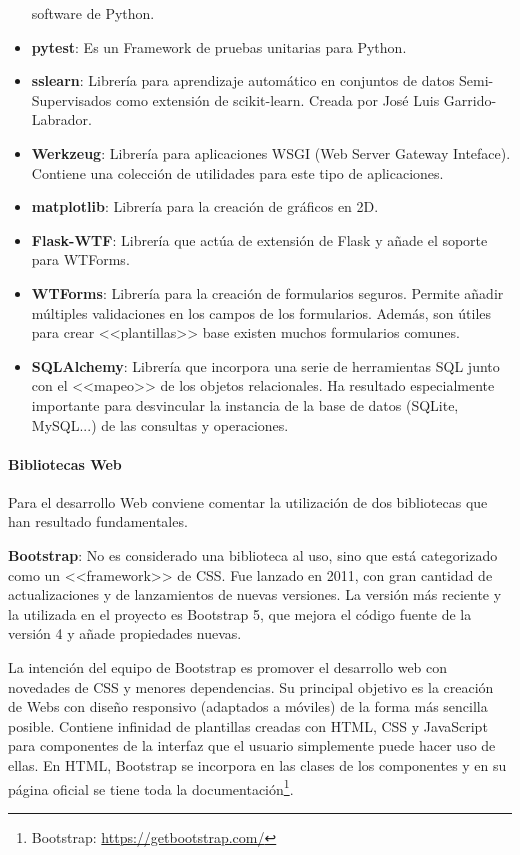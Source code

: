 \begin{itemize}
	software de Python.
	\item \textbf{pytest}: Es un Framework de pruebas unitarias para Python.
	\item \textbf{sslearn}: Librería para aprendizaje automático en conjuntos de
	datos Semi-Supervisados como extensión de scikit-learn. Creada por José Luis
	Garrido-Labrador.
	\item \textbf{Werkzeug}: Librería para aplicaciones WSGI (Web Server Gateway
	Inteface). Contiene una colección de utilidades para este tipo de
	aplicaciones.
	\item \textbf{matplotlib}: Librería para la creación de gráficos en 2D.
	\item \textbf{Flask-WTF}: Librería que actúa de extensión de Flask y añade
	el soporte para WTForms.
	\item \textbf{WTForms}: Librería para la creación de formularios seguros.
	Permite añadir múltiples validaciones en los campos de los formularios.
	Además, son útiles para crear <<plantillas>> base existen muchos formularios
	comunes.
	\item \textbf{SQLAlchemy}: Librería que incorpora una serie de herramientas
	SQL junto con el <<mapeo>> de los objetos relacionales. Ha resultado
	especialmente importante para desvincular la instancia de la base de datos
	(SQLite, MySQL...) de las consultas y operaciones.
\end{itemize}

\paragraph{Bibliotecas Web} Para el desarrollo Web conviene comentar la
utilización de dos bibliotecas que han resultado fundamentales.

\textbf{Bootstrap}: No es considerado una biblioteca al uso, sino que está
categorizado como un <<framework>> de CSS. Fue lanzado en 2011, con gran
cantidad de actualizaciones y de lanzamientos de nuevas versiones. La versión
más reciente y la utilizada en el proyecto es Bootstrap 5, que mejora el código
fuente de la versión 4 y añade propiedades nuevas. 

La intención del equipo de Bootstrap es promover el desarrollo web con novedades
de CSS y menores dependencias. Su principal objetivo es la creación de Webs con
diseño responsivo (adaptados a móviles) de la forma más sencilla posible.
Contiene infinidad de plantillas creadas con HTML, CSS y JavaScript para
componentes de la interfaz que el usuario simplemente puede hacer uso de ellas.
En HTML, Bootstrap se incorpora en las clases de los componentes y en su página
oficial se tiene toda la documentación\footnote{Bootstrap:
\url{https://getbootstrap.com/}}.

